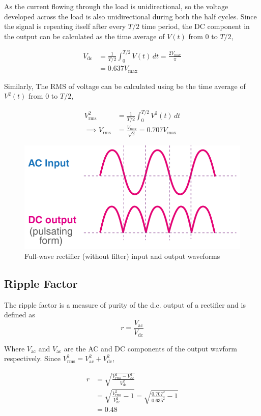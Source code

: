 As the current flowing through the load is unidirectional, so the voltage developed across the load is also unidirectional during both the half cycles. Since the signal is repeating itself after every $T/2$ time period, the DC component in the output can be calculated as the time average of $V(t)$ from $0$ to $T/2$, 

\begin{align*}
     V_{\text{dc}} &= \frac{1}{T/2}\int_{0}^{T/2} V(t) \,dt = \frac{2V_{\text{max}}}{\pi} \\
     &=0.637V_{\text{max}}
\end{align*}

Similarly, The RMS of voltage can be calculated using be the time average of $V^2(t)$ from $0$ to $T/2$,

\begin{align*}
    V_{\text{rms}}^2 &= \frac{1}{T/2}\int_{0}^{T/2} V^2(t) \,dt \\
     \implies V_{\text{rms}} &= \frac{V_{\text{max}}}{\sqrt{2}} = 0.707V_{\text{max}}
\end{align*}

\begin{figure}[H]
    \centering
    \includegraphics[width=0.65\columnwidth]{images/f0.png}
    \caption{Full-wave rectifier (without filter) input and output waveforms}
\end{figure}

\subsection{Ripple Factor}
The ripple factor is a measure of purity of the d.c. output of a rectifier and is defined as
\begin{equation}
    r = \frac{V_\text{ac}}{V_\text{dc}}
\end{equation}

Where $V_\text{ac}$ and $V_\text{ac}$ are the AC and DC components of the output wavform respectively. Since $V^2_\text{rms} = V^2_\text{ac} + V^2_\text{dc}$,

\begin{align*}
    r &= \sqrt{\frac{V^2_\text{rms} - V^2_\text{dc}}{V^2_\text{dc}}}\\
    &= \sqrt{\frac{V^2_\text{rms}}{V^2_\text{dc}}-1} = \sqrt{\frac{0.707^2}{0.635^2}-1}\\ &= 0.48
\end{align*}

